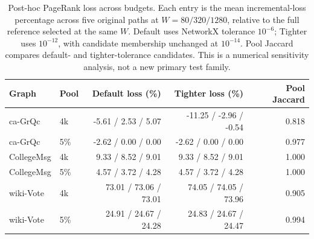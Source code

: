 \begin{table}[htbp]
\caption{Post-hoc PageRank loss across budgets. Each entry is the mean incremental-loss percentage across five original paths at $W=80/320/1280$, relative to the full reference selected at the same $W$. Default uses NetworkX tolerance $10^{-6}$; Tighter uses $10^{-12}$, with candidate membership unchanged at $10^{-14}$. Pool Jaccard compares default- and tighter-tolerance candidates. This is a numerical sensitivity analysis, not a new primary test family.}\label{tab:precision-budget}
\begin{tabular}{llrrr}
\toprule
Graph & Pool & Default loss (\%) & Tighter loss (\%) & Pool Jaccard \\
\midrule
ca-GrQc & 4k & -5.61 / 2.53 / 5.07 & -11.25 / -2.96 / -0.54 & 0.818 \\
ca-GrQc & 5\% & -2.62 / 0.00 / 0.00 & -2.62 / 0.00 / 0.00 & 0.977 \\
CollegeMsg & 4k & 9.33 / 8.52 / 9.01 & 9.33 / 8.52 / 9.01 & 1.000 \\
CollegeMsg & 5\% & 4.57 / 3.72 / 4.28 & 4.57 / 3.72 / 4.28 & 1.000 \\
wiki-Vote & 4k & 73.01 / 73.06 / 73.01 & 74.05 / 74.05 / 73.96 & 0.905 \\
wiki-Vote & 5\% & 24.91 / 24.67 / 24.28 & 24.83 / 24.67 / 24.47 & 0.994 \\
\bottomrule
\end{tabular}
\end{table}
